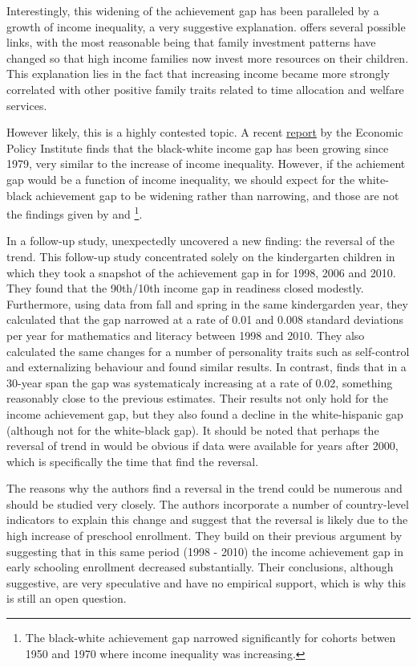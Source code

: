 \documentclass[11pt, a4paper]{article}\usepackage[]{graphicx}\usepackage[]{color}
\begin{document}
Interestingly, this widening of the achievement gap has been paralleled by a growth of income inequality, a very suggestive explanation. \citet{reardon2011} offers several possible links, with the most reasonable being that family investment patterns have changed so that high income families now invest more resources on their children. This explanation lies in the fact that increasing income became more strongly correlated with other positive family traits related to time allocation and welfare services.

However likely, this is a highly contested topic. A recent \href{http://www.epi.org/files/pdf/101972.pdf}{report} by the Economic Policy Institute finds that the black-white income gap has been growing since 1979, very similar to the increase of income inequality. However, if the achiement gap would be a function of income inequality, we should expect for the white-black achievement gap to be widening rather than narrowing, and those are not the findings given by \citet{reardon2011} and \citet{magnuson2008} \footnote{The black-white achievement gap narrowed significantly for cohorts betwen 1950 and 1970 where income inequality was increasing.}.

In a follow-up study, \citet{reardon_portilla} unexpectedly uncovered a new finding: the reversal of the trend. This follow-up study concentrated solely on the kindergarten children in which they took a snapshot of the achievement gap in for 1998, 2006 and 2010. They found that the 90th/10th income gap in readiness closed modestly. Furthermore, using data from fall and spring in the same kindergarden year, they calculated that the gap narrowed at a rate of 0.01 and 0.008 standard deviations per year for mathematics and literacy between 1998 and 2010. They also calculated the same changes for a number of personality traits such as self-control and externalizing behaviour and found similar results. In contrast, \citet{reardon2011} finds that in a 30-year span the gap was systematicaly increasing at a rate of 0.02, something reasonably close to the previous estimates. Their results not only hold for the income achievement gap, but they also found a decline in the white-hispanic gap (although not for the white-black gap). It should be noted that perhaps the reversal of trend in \citet{reardon2011} would be obvious if data were available for years after 2000,  which is specifically the time that \citet{reardon_portilla} find the reversal.

The reasons why the authors find a reversal in the trend could be numerous and should be studied very closely. The authors incorporate a number of country-level indicators to explain this change and suggest that the reversal is likely due to the high increase of preschool enrollment. They build on their previous argument by suggesting that in this same period (1998 - 2010) the income achievement gap in early schooling enrollment decreased substantially. Their conclusions, although suggestive, are very speculative and have no empirical support, which is why this is still an open question.
\end{document}
